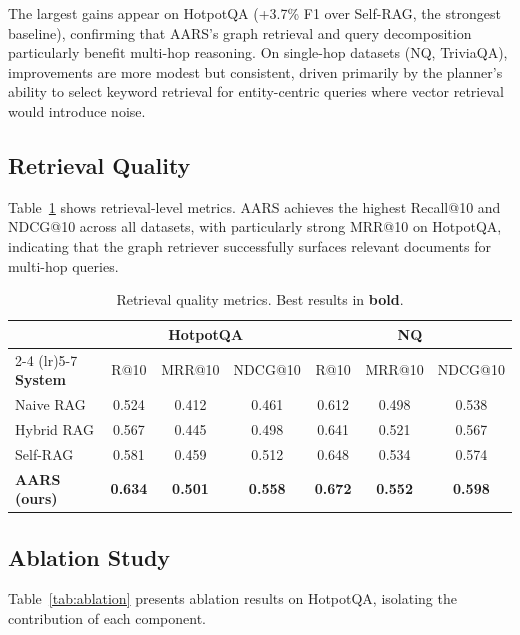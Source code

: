 \documentclass[runningheads]{llncs}
\begin{document}
The largest gains appear on HotpotQA (+3.7\% F1 over Self-RAG, the strongest baseline), confirming that AARS's graph retrieval and query decomposition particularly benefit multi-hop reasoning. On single-hop datasets (NQ, TriviaQA), improvements are more modest but consistent, driven primarily by the planner's ability to select keyword retrieval for entity-centric queries where vector retrieval would introduce noise.

\subsection{Retrieval Quality}

Table~\ref{tab:retrieval_results} shows retrieval-level metrics. AARS achieves the highest Recall@10 and NDCG@10 across all datasets, with particularly strong MRR@10 on HotpotQA, indicating that the graph retriever successfully surfaces relevant documents for multi-hop queries.

\begin{table}[t]
\centering
\caption{Retrieval quality metrics. Best results in \textbf{bold}.}
\label{tab:retrieval_results}
\begin{tabular}{lccc|ccc}
\toprule
 & \multicolumn{3}{c}{\textbf{HotpotQA}} & \multicolumn{3}{c}{\textbf{NQ}} \\
\cmidrule(lr){2-4} \cmidrule(lr){5-7}
\textbf{System} & R@10 & MRR@10 & NDCG@10 & R@10 & MRR@10 & NDCG@10 \\
\midrule
Naive RAG & 0.524 & 0.412 & 0.461 & 0.612 & 0.498 & 0.538 \\
Hybrid RAG & 0.567 & 0.445 & 0.498 & 0.641 & 0.521 & 0.567 \\
Self-RAG & 0.581 & 0.459 & 0.512 & 0.648 & 0.534 & 0.574 \\
\textbf{AARS (ours)} & \textbf{0.634} & \textbf{0.501} & \textbf{0.558} & \textbf{0.672} & \textbf{0.552} & \textbf{0.598} \\
\bottomrule
\end{tabular}
\end{table}

\subsection{Ablation Study}

Table~\ref{tab:ablation} presents ablation results on HotpotQA, isolating the contribution of each component.
\end{document}
